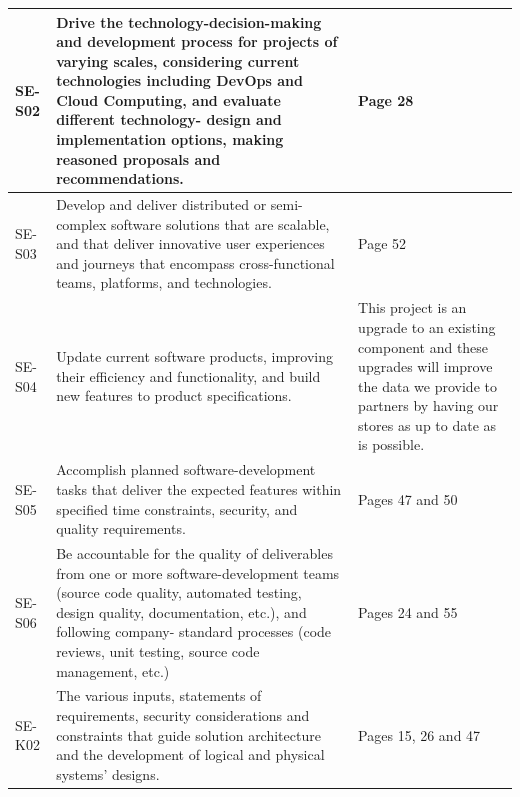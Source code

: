 \begin{longtable}{|p{2cm}|p{8cm}|p{4cm}|}
      SE-S02              & Drive the technology-decision-making and development process for
                            projects of varying scales, considering current technologies including
                            DevOps and Cloud Computing, and evaluate different technology-
                            design and implementation options, making reasoned proposals and
                            recommendations. & Page 28 \\ \hline

      SE-S03              & Develop and deliver distributed or semi-complex software solutions
                            that are scalable, and that deliver innovative user experiences and
                            journeys that encompass cross-functional teams, platforms, and technologies. & Page 52 \\ \hline

      SE-S04              & Update current software products, improving their efficiency and
                            functionality, and build new features to product specifications. 
                          
                          & This project is an upgrade to an existing component and these upgrades will improve the data we provide to partners 
                          by having our stores as up to date as is possible.  \\ \hline

      SE-S05              & Accomplish planned software-development tasks that deliver the expected
                            features within specified time constraints, security, and quality requirements. & Pages 47 and 50 \\ \hline

      SE-S06              & Be accountable for the quality of deliverables from one or more
                            software-development teams (source code quality, automated testing,
                            design quality, documentation, etc.), and following company-
                            standard processes (code reviews, unit testing, source code management, etc.)  & Pages 24 and 55 \\ \hline

      SE-K02              & The various inputs, statements of requirements, security considerations
                            and constraints that guide solution architecture and the development
                            of logical and physical systems' designs. & Pages 15, 26 and 47 \\ \hline


\end{longtable}
